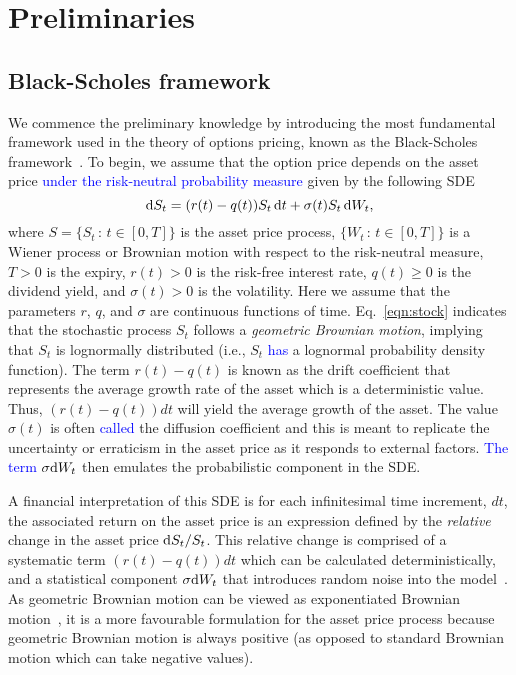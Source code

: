 \chapter{Preliminaries}

\section{Black-Scholes framework}
We commence the preliminary knowledge by introducing the most fundamental framework used in the theory of options pricing, known as the Black-Scholes framework~\cite{Black1973}. To begin, we assume that the option price depends on the asset price \textcolor{blue}{under the risk-neutral probability measure} given by the following SDE
	\begin{equation}
	\label{eqn:stock}
		\mathrm d S_t = (r(t)-q(t))S_t \, \mathrm d t + \sigma(t)S_t  \, \mathrm d W_t,
	\end{equation}
where $S = \{ S_t \, : \, t \in [0,T] \}$ is the asset price process, $\{ W_t \, : \, t \in [0,T] \}$ is a Wiener process or Brownian motion with respect to the risk-neutral measure, $T > 0$ is the expiry, $r(t) > 0$ is the risk-free interest rate, $q(t) \geq 0$ is the dividend yield, and $\sigma(t) > 0$ is the volatility.
Here we assume that the parameters $r$, $q$, and $\sigma$ are continuous functions of time. Eq.~\eqref{eqn:stock} indicates that the stochastic process $S_t$ follows a
\emph{geometric Brownian motion}, implying that $S_t$ is lognormally distributed (i.e., $S_t$ \textcolor{blue}{has} a lognormal probability density function). The term $r(t)-q(t)$ is known as the drift coefficient that represents the average growth rate of the asset which is a deterministic value. Thus, $(r(t)-q(t))dt$ will yield the average growth of the asset.
The value $\sigma(t)$ is often \textcolor{blue}{called} the diffusion coefficient and this is meant to replicate the uncertainty or erraticism in the asset price as it responds to external factors. \textcolor{blue}{The term $\sigma \mathrm d W_t$} then emulates the probabilistic component in the SDE.

A financial interpretation of this SDE is for each infinitesimal time increment, $dt$, the associated return on the asset price is an expression defined by the \emph{relative} change in the asset price $\mathrm d S_t/S_t$.
This relative change is comprised of a systematic term $(r(t)-q(t))dt$ which can be calculated deterministically, and a statistical component $\sigma \mathrm d W_t$ that introduces random noise into the model~\cite{Wilmott1995}. As geometric Brownian motion can be viewed as exponentiated Brownian motion~\cite{Glasserman2013}, it is a more favourable formulation for the asset price process
because geometric Brownian motion is always positive (as opposed to standard Brownian motion which can take negative values).

